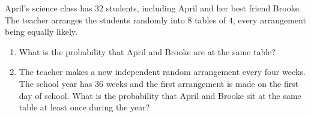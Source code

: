April's science class has $32$ students, including April and her best friend Brooke. The teacher arranges the students randomly into $8$ tables of $4$, every arrangement being equally likely.
\begin{enumerate}
\item[(a)] What is the probability that April and Brooke are at the same table?
\item[(b)] The teacher makes a new independent random arrangement every four weeks. The school year has $36$ weeks and the first arrangement is made on the first day of school. What is the probability that April and Brooke sit at the same table at least once during the year?
\end{enumerate}
